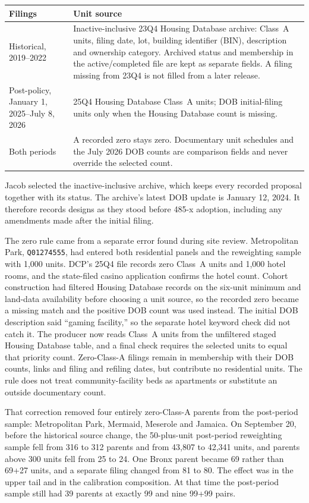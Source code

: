 \begin{center}
\small
\begin{tabular}{p{}p{}}
\hline
Filings & Unit source \\
\hline
Historical, 2019--2022 &
Inactive-inclusive 23Q4 Housing Database archive: Class~A units, filing date,
lot, building identifier (BIN), description and ownership category. Archived
status and membership in the active/completed file are kept as separate
fields. A filing missing from 23Q4 is not filled from a later release. \\
Post-policy, January 1, 2025--July 8, 2026 &
25Q4 Housing Database Class~A units; DOB initial-filing units only when the
Housing Database count is missing. \\
Both periods &
A recorded zero stays zero. Documentary unit schedules and the July 2026 DOB
counts are comparison fields and never override the selected count. \\
\hline
\end{tabular}
\end{center}

Jacob selected the inactive-inclusive archive, which keeps every recorded
proposal together with its status. The archive's latest DOB update is January
12, 2024. It therefore records designs as they stood before 485-x adoption,
including any amendments made after the initial filing.

The zero rule came from a separate error found during site review. Metropolitan
Park, \texttt{Q01274555}, had entered both residential panels and the
reweighting sample with 1,000 units. DCP's 25Q4 file records zero Class~A units
and 1,000 hotel rooms, and the state-filed casino application confirms the
hotel count. Cohort construction had filtered Housing Database records on the
six-unit minimum and land-data availability before choosing a unit source, so
the recorded zero became a missing match and the positive DOB count was used
instead. The initial DOB description said ``gaming facility,'' so the separate
hotel keyword check did not catch it. The producer now reads Class~A units
from the unfiltered staged Housing Database table, and a final check requires
the selected units to equal that priority count. Zero-Class-A filings remain
in membership with their DOB counts, links and filing and refiling dates, but
contribute no residential units. The rule does not treat community-facility
beds as apartments or substitute an outside documentary count.

That correction removed four entirely zero-Class-A parents from the
post-period sample: Metropolitan Park, Mermaid, Meserole and Jamaica. On
September 20, before the historical source change, the 50-plus-unit
post-period reweighting sample fell from 316 to 312 parents and from 43,807
to 42,341 units, and parents above 300 units fell from 25 to 24. One Bronx parent became 69 rather than 69+27 units,
and a separate filing changed from 81 to 80. The effect was in the upper tail
and in the calibration composition. At that time the post-period sample still
had 39 parents at exactly 99 and nine 99+99 pairs.

